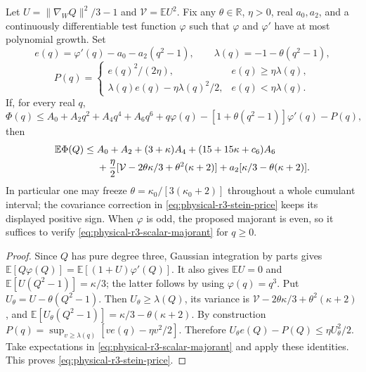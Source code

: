 \begin{proposition}
\label{prop:physical-r3-stein-majorant}
Let $U=\|\nabla_WQ\|^2/3-1$ and $\mathcal V=\mathbb EU^2$.
Fix any $\theta\in\mathbb R$, $\eta>0$, real $a_0,a_2$, and a
continuously differentiable test function $\varphi$ such that
$\varphi$ and $\varphi'$ have at most polynomial growth.
Set
\[
 e(q)=\varphi'(q)-a_0-a_2(q^2-1),\qquad
 \lambda(q)=-1-\theta(q^2-1),
\]
\[
 P(q)=\begin{cases}
 e(q)^2/(2\eta),&e(q)\geq\eta\lambda(q),\\
 \lambda(q)e(q)-\eta\lambda(q)^2/2,&e(q)<\eta\lambda(q).
 \end{cases}
\]
If, for every real $q$,
\begin{equation}\label{eq:physical-r3-scalar-majorant}
 \Phi(q)\leq A_0+A_2q^2+A_4q^4+A_6q^6+
 q\varphi(q)-[1+\theta(q^2-1)]\varphi'(q)-P(q),
\end{equation}
then
\begin{align}\label{eq:physical-r3-stein-price}
 \mathbb E\Phi(Q)\leq{}&A_0+A_2+(3+\kappa)A_4
 +(15+15\kappa+c_6)A_6\notag\\
 &+\frac\eta2[\mathcal V-2\theta\kappa/3+\theta^2(\kappa+2)]
 +a_2[\kappa/3-\theta(\kappa+2)].
\end{align}
In particular one may freeze $\theta=\kappa_0/[3(\kappa_0+2)]$
throughout a whole cumulant interval; the covariance correction in
\eqref{eq:physical-r3-stein-price} keeps its displayed positive sign.
When $\varphi$ is odd, the proposed majorant is even, so it suffices
to verify \eqref{eq:physical-r3-scalar-majorant} for $q\geq0$.
\end{proposition}
\begin{proof}
Since $Q$ has pure degree three, Gaussian integration by parts gives
$\mathbb E[Q\varphi(Q)]=\mathbb E[(1+U)\varphi'(Q)]$.
It also gives $\mathbb EU=0$ and
$\mathbb E[U(Q^2-1)]=\kappa/3$; the latter follows by using
$\varphi(q)=q^3$.  Put $U_\theta=U-\theta(Q^2-1)$.
Then $U_\theta\geq\lambda(Q)$, its variance is
$\mathcal V-2\theta\kappa/3+\theta^2(\kappa+2)$, and
$\mathbb E[U_\theta(Q^2-1)]=\kappa/3-\theta(\kappa+2)$.
By construction $P(q)=\sup_{v\geq\lambda(q)}[ve(q)-\eta v^2/2]$.
Therefore $U_\theta e(Q)-P(Q)\leq\eta U_\theta^2/2$.
Take expectations in \eqref{eq:physical-r3-scalar-majorant} and apply
these identities.  This proves \eqref{eq:physical-r3-stein-price}.
\end{proof}


